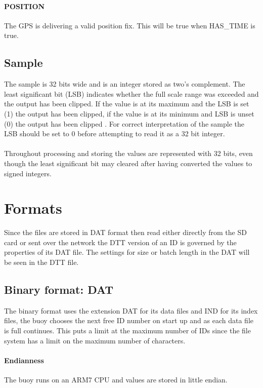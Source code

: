 \documentclass[a4paper]{article}
\begin{document}
\begin{multicols}{2}
    \paragraph{POSITION} The GPS is delivering a valid
    position fix. This will be true when HAS\_TIME is true.

    \subsection{Sample} The sample is 32 bits wide and is an integer
    stored as two's complement. The least significant bit (LSB)
    indicates whether the full scale range was exceeded and the output
    has been clipped. If the value is at its maximum and the LSB is set
    (1) the output has been clipped, if the value is at its minimum and
    LSB is unset (0) the output has been clipped \cite{ads1282_ds}. For
    correct interpretation of the sample the LSB should be set to 0
    before attempting to read it as a 32 bit integer.

    \paragraph{} Throughout processing and storing the values are
    represented with 32 bits, even though the least significant bit may
    cleared after having converted the values to signed integers.

  \section{Formats}
  Since the files are stored in DAT format then read either directly
  from the SD card or sent over the network the DTT version of an ID is
  governed by the properties of its DAT file. The settings for size or
  batch length in the DAT will be seen in the DTT file.

  \subsection{Binary format: DAT}
  The binary format uses the extension DAT for its data files and IND
  for its index files, the buoy chooses the next free ID number on start
  up and as each data file is full continues. This puts a limit at the
  maximum number of IDs since the file system has a limit on the maximum
  number of characters.

  \paragraph{Endianness} The buoy runs on an ARM7 CPU and values are
  stored in little endian.


\end{multicols}
\end{document}
